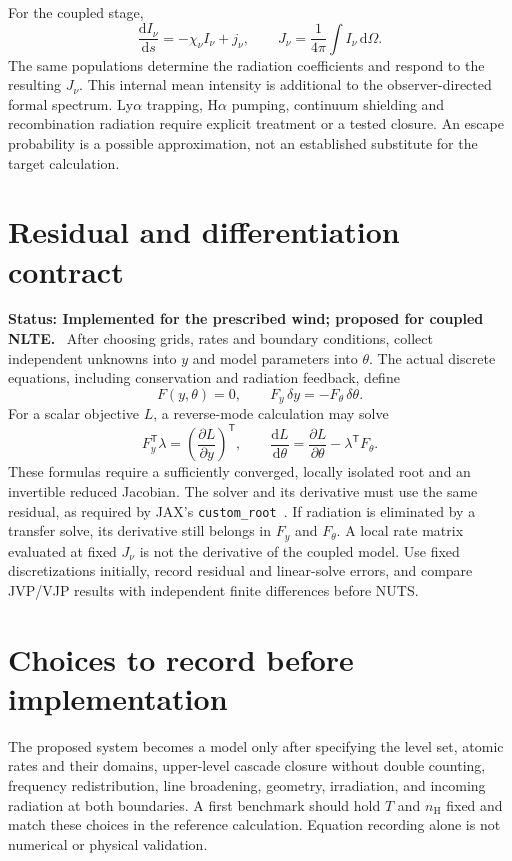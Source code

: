 \documentclass[11pt,a4paper]{article}
\newcommand{\dd}{\mathrm{d}}
\newcommand{\nH}{n_{\mathrm H}}
\newcommand{\status}[1]{\par\noindent\textbf{Status: #1.}\ }
\begin{document}
For the coupled stage,
\begin{equation}
 \frac{\dd I_\nu}{\dd s}=-\chi_\nu I_\nu+j_\nu,
 \qquad J_\nu=\frac{1}{4\pi}\int I_\nu\,\dd\Omega.
 \tag{SE-6}\label{eq:radiation-feedback}
\end{equation}
The same populations determine the radiation coefficients and respond to
the resulting $J_\nu$. This internal mean intensity is additional to the
observer-directed formal spectrum. Ly$\alpha$ trapping, H$\alpha$ pumping,
continuum shielding and recombination radiation require explicit treatment
or a tested closure. An escape probability is a possible approximation,
not an established substitute for the target calculation.

\section{Residual and differentiation contract}\label{sec:implicit}
\status{Implemented for the prescribed wind; proposed for coupled NLTE}
After choosing grids, rates and boundary conditions, collect independent
unknowns into $y$ and model parameters into $\theta$. The actual discrete
equations, including conservation and radiation feedback, define
\begin{equation}
 F(y,\theta)=0,\qquad
 F_y\,\delta y=-F_\theta\,\delta\theta.
 \tag{AD-1}\label{eq:implicit-jvp}
\end{equation}
For a scalar objective $L$, a reverse-mode calculation may solve
\begin{equation}
 F_y^{\mathsf T}\lambda=\left(\frac{\partial L}{\partial y}\right)^{\mathsf T},
 \qquad
 \frac{\dd L}{\dd\theta}
 =\frac{\partial L}{\partial\theta}-\lambda^{\mathsf T}F_\theta.
 \tag{AD-2}\label{eq:implicit-vjp}
\end{equation}
These formulas require a sufficiently converged, locally isolated root and
an invertible reduced Jacobian. The solver and its derivative must use the
same residual, as required by JAX's \texttt{custom\_root}~\cite{jax}.
If radiation is eliminated by a transfer solve, its derivative still belongs
in $F_y$ and $F_\theta$. A local rate matrix evaluated at fixed $J_\nu$ is
not the derivative of the coupled model.
Use fixed discretizations initially, record residual and linear-solve errors,
and compare JVP/VJP results with independent finite differences before NUTS.

\section{Choices to record before implementation}\label{sec:choices}
The proposed system becomes a model only after specifying the level set,
atomic rates and their domains, upper-level cascade closure without double
counting, frequency redistribution, line broadening, geometry, irradiation,
and incoming radiation at both boundaries. A first benchmark should hold
$T$ and $\nH$ fixed and match these choices in the reference calculation.
Equation recording alone is not numerical or physical validation.
\end{document}
